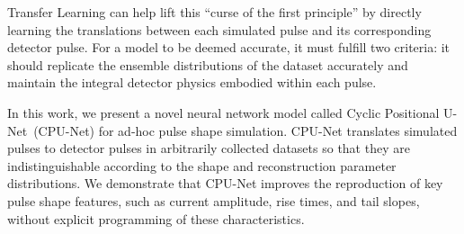 Transfer Learning can help lift this ``curse of the first principle'' by directly learning the translations between each simulated pulse and its corresponding detector pulse. For a model to be deemed accurate, it must fulfill two criteria: it should replicate the ensemble distributions of the dataset accurately and maintain the integral detector physics embodied within each pulse.

In this work, we present a novel neural network model called Cyclic Positional U-Net~(CPU-Net) for ad-hoc pulse shape simulation. CPU-Net translates simulated pulses to detector pulses in arbitrarily collected datasets so that they are indistinguishable according to the shape and reconstruction parameter distributions. We demonstrate that CPU-Net improves the reproduction of key pulse shape features, such as current amplitude, rise times, and tail slopes, without explicit programming of these characteristics.

